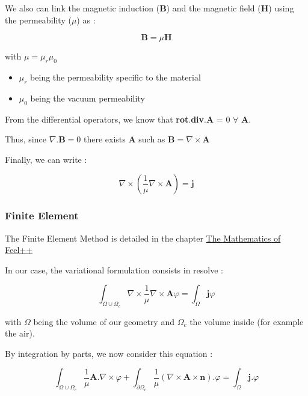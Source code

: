 \documentclass[11pt]{amsart}
\begin{document}
We also can link the magnetic induction (\textbf{B}) and the magnetic field (\textbf{H}) using the permeability ($\mu$) as :



\[
\textbf{B}=\mu\textbf{H}
\]



with $\mu=\mu_{r}\mu_{0}$


\begin{itemize}

\item $\mu_{r}$ being the permeability specific to the material

\item $\mu_{0}$ being the vacuum permeability

\end{itemize}


From the differential operators, we know that \textbf{rot}.\textbf{div}.\textbf{A} = 0    $\forall$ \textbf{A}.


Thus, since $\nabla.\textbf{B}=0$ there exists \textbf{A} such as $\textbf{B}=\nabla\times \textbf{A}$


Finally, we can write :



\[
\nabla\times\left(\frac{1}{\mu}\nabla\times\textbf{A}\right)=\textbf{j}
\]



\hypertarget{x-finite-element}{\subsubsection{Finite Element}}
The Finite Element Method is detailed in the chapter \href{http://book.feelpp.org/math/fem#cha:appr-r-probl-1}{The Mathematics of Feel++}


In our case, the variational formulation consists in resolve :



\[
\int_{\Omega\cup\Omega_{c}}\nabla\times\frac{1}{\mu}\nabla\times\textbf{A}\varphi=\int_{\Omega}\textbf{j}\varphi
\]



with $\Omega$ being the volume of our geometry and $\Omega_{c}$ the volume inside (for example the air).


By integration by parts, we now consider this equation :



\[
\int_{\Omega\cup\Omega_{c}}\frac{1}{\mu}\textbf{A}.\nabla\times\varphi+\int_{\partial\Omega_{c}}\frac{1}{\mu}\left(\nabla\times\textbf{A}\times\textbf{n}\right).\varphi=\int_{\Omega}\textbf{j}.\varphi
\]
\end{document}
